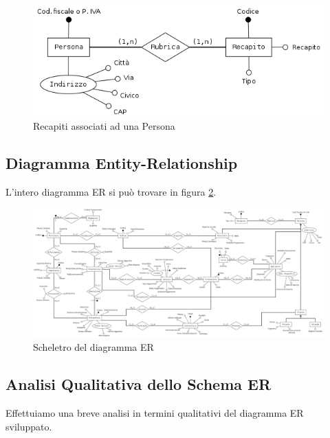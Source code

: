 			\begin{figure}[H]
				\centering
				\includegraphics[width=11.5cm]{images/finitures/persona_rubrica.png}
				\caption{Recapiti associati ad una Persona}
				\label{fig:persona_recapito}
			\end{figure}
	
	\subsection{Diagramma Entity-Relationship}
		
		L'intero diagramma ER si può trovare in figura \ref{fig:er}.
			
		\begin{figure}
			\centering
			\includegraphics[width=22cm]{images/finitures/schema.png}
			\caption{Scheletro del diagramma ER}
			\label{fig:er}
		\end{figure}

		\newpage

	\subsection{Analisi Qualitativa dello Schema ER}
		
		Effettuiamo una breve analisi in termini qualitativi del diagramma ER sviluppato.
		
